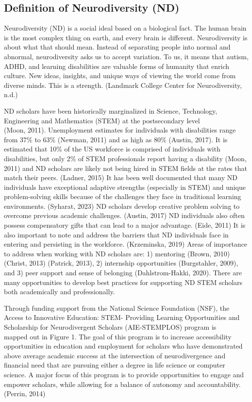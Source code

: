 \documentclass[11.5pt]{sig-alternate}
\begin{document}
\subsection*{Definition of Neurodiversity (ND)}
\begin{large}
Neurodiversity (ND) is a social ideal based on a biological fact. The human brain is the most complex thing on earth, and every brain is different. Neurodiversity is about what that should mean. Instead of separating people into normal and abnormal, neurodiversity asks us to accept variation. To us, it means that autism, ADHD, and learning disabilities are valuable forms of humanity that enrich culture. New ideas, insights, and unique ways of viewing the world come from diverse minds. This is a strength. (Landmark College Center for Neurodiversity, n.d.) 

ND scholars have been historically marginalized in Science, Technology, Engineering and Mathematics (STEM) at the postsecondary level \\(Moon, 2011). Unemployment estimates for individuals with disabilities range from 37\% to 63\% (Newman, 2011) and as high as 80\% (Austin, 2017). It is estimated that 10\% of the US workforce is comprised of individuals with disabilities, but only 2\% of STEM professionals report having a disability (Moon, 2011) and ND scholars are likely not being hired in STEM fields at the rates that match their peers. (Ladner, 2015) It has been well documented that many ND individuals have exceptional adaptive strengths (especially in STEM) and unique problem-solving skills because of the challenges they face in traditional learning environments. (Syharat, 2023) ND scholars develop creative problem solving to overcome previous academic challenges. (Austin, 2017) ND individuals also often possess compensatory gifts that can lead to a major advantage. (Eide, 2011) It is also important to note and address the barriers that ND individuals face in entering and persisting in the workforce. (Krzeminska, 2019) Areas of importance to address when working with ND scholars are: 1) mentoring (Brown, 2010) (Christ, 2013) (Patrick, 2013), 2) internship opportunities (Burgstahler, 2009), and 3) peer support and sense of belonging (Dahlstrom-Hakki, 2020). There are many opportunities to develop best practices for supporting ND STEM scholars both academically and professionally. 

Through funding support from the National Science Foundation (NSF), the Access to Innovative Education: STEM- Providing Learning Opportunities and Scholarship for Neurodivergent Scholars (AIE-STEMPLOS) program is \\mapped out in Figure 1. The goal of this program is to increase accessibility opportunities in education and employment for scholars who have demonstrated above average academic success at the intersection of neurodivergence and financial need that are pursuing either a degree in life science or computer science. A major focus of this program is to provide opportunities to engage and empower scholars, while allowing for a balance of autonomy and accountability. (Perrin, 2014)


\end{large}
\end{document}
